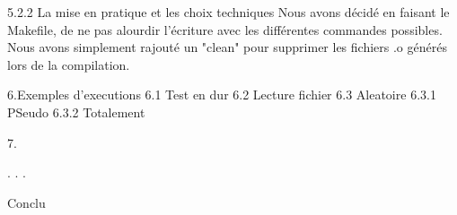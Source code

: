 5.2.2 La mise en pratique et les choix techniques
Nous avons décidé en faisant le Makefile, de ne pas alourdir l'écriture avec les différentes commandes possibles.
Nous avons simplement rajouté un "clean" pour supprimer les fichiers .o générés lors de la compilation. 



6.Exemples d'executions
6.1 Test en dur
6.2 Lecture fichier
6.3 Aleatoire
6.3.1 PSeudo
6.3.2 Totalement

7.


.
.
.

Conclu
